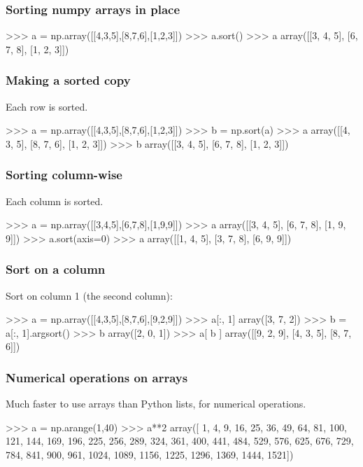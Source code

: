 \documentclass{beamer}
\begin{document}
\begin{frame}[fragile]
\frametitle{Sorting numpy arrays in place}
\begin{code}
>>> a = np.array([[4,3,5],[8,7,6],[1,2,3]]) 
>>> a.sort()
>>> a
array([[3, 4, 5],
       [6, 7, 8],
       [1, 2, 3]])
\end{code}
\end{frame}

\begin{frame}[fragile]
\frametitle{Making a sorted copy}
Each row is sorted.
\begin{code}
>>> a = np.array([[4,3,5],[8,7,6],[1,2,3]])
>>> b = np.sort(a)
>>> a
array([[4, 3, 5],
       [8, 7, 6],
       [1, 2, 3]])
>>> b
array([[3, 4, 5],
       [6, 7, 8],
       [1, 2, 3]])
\end{code}
\end{frame}

\begin{frame}[fragile]
\frametitle{{Sorting column-wise}}
Each column is sorted.
\begin{code}
>>> a = np.array([[3,4,5],[6,7,8],[1,9,9]])
>>> a
array([[3, 4, 5],
       [6, 7, 8],
       [1, 9, 9]])
>>> a.sort(axis=0)
>>> a
array([[1, 4, 5],
       [3, 7, 8],
       [6, 9, 9]])
\end{code}
\end{frame}

\begin{frame}[fragile]
\frametitle{{Sort on a column}}
Sort on column 1 (the second column):
\begin{code}
>>> a = np.array([[4,3,5],[8,7,6],[9,2,9]])
>>> a[:, 1]
array([3, 7, 2])
>>> b = a[:, 1].argsort()
>>> b
array([2, 0, 1])
>>> a[ b ]
array([[9, 2, 9],
       [4, 3, 5],
       [8, 7, 6]])
\end{code}
\end{frame}

\begin{frame}[fragile]
\frametitle{Numerical operations on arrays}
Much faster to use arrays than Python lists, for numerical operations.
\begin{code}
>>> a = np.arange(1,40)
>>> a**2
array([   1,    4,    9,   16,   25,   36,   49,   64,   81,  100,  121,
        144,  169,  196,  225,  256,  289,  324,  361,  400,  441, 
        484, 529,  576,  625,  676,  729,  784,  841,  900,  961, 
       1024, 1089, 1156, 1225, 1296, 1369, 1444, 1521])
\end{code}
\end{frame}
\end{document}
